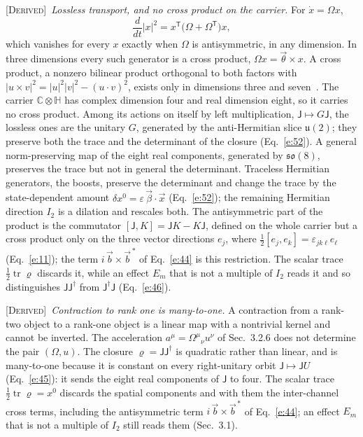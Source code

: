 \documentclass[10pt]{article}
\newcommand{\sJ}{\mathsf{J}}
\newcommand{\tr}{\operatorname{tr}}
\newcommand{\Derived}{\noindent\textsc{[Derived]}\ }
\begin{document}
\Derived \textit{Lossless transport, and no cross product on the carrier.} For $\dot x=\Omega x$,
\begin{equation*}
\frac{d}{dt}|x|^2=x^{\mathsf T}\bigl(\Omega+\Omega^{\mathsf T}\bigr)x ,
\end{equation*}
which vanishes for every $x$ exactly when $\Omega$ is antisymmetric, in any dimension. In three dimensions every such generator is a cross product, $\Omega x=\vec\theta\times x$. A cross product, a nonzero bilinear product orthogonal to both factors with $|u\times v|^2=|u|^2|v|^2-(u\cdot v)^2$, exists only in dimensions three and seven~\cite{browngray}. The carrier $\mathbb C\otimes\mathbb H$ has complex dimension four and real dimension eight, so it carries no cross product. Among its actions on itself by left multiplication, $\sJ\mapsto G\sJ$, the lossless ones are the unitary $G$, generated by the anti-Hermitian slice $\mathfrak u(2)$; they preserve both the trace and the determinant of the closure (Eq.~\eqref{e:52}). A general norm-preserving map of the eight real components, generated by $\mathfrak{so}(8)$, preserves the trace but not in general the determinant. Traceless Hermitian generators, the boosts, preserve the determinant and change the trace by the state-dependent amount $\delta x^0=\varepsilon\,\vec\beta\cdot\vec x$ (Eq.~\eqref{e:52}); the remaining Hermitian direction $I_2$ is a dilation and rescales both. The antisymmetric part of the product is the commutator $[\sJ,K]=\sJ K-K\sJ$, defined on the whole carrier but a cross product only on the three vector directions $e_j$, where $\tfrac12[e_j,e_k]=\varepsilon_{jk\ell}e_\ell$ (Eq.~\eqref{e:11}); the term $i\,\vec b\times\vec b^{\,*}$ of Eq.~\eqref{e:44} is this restriction. The scalar trace $\tfrac12\tr\varrho$ discards it, while an effect $E_m$ that is not a multiple of $I_2$ reads it and so distinguishes $\sJ\sJ^\dagger$ from $\sJ^\dagger\sJ$ (Eq.~\eqref{e:46}).

\Derived \textit{Contraction to rank one is many-to-one.} A contraction from a rank-two object to a rank-one object is a linear map with a nontrivial kernel and cannot be inverted. The acceleration $a^\mu=\Omega^\mu{}_\nu u^\nu$ of Sec.~3.2.6 does not determine the pair $(\Omega,u)$. The closure $\varrho=\sJ\sJ^\dagger$ is quadratic rather than linear, and is many-to-one because it is constant on every right-unitary orbit $\sJ\mapsto\sJ U$ (Eq.~\eqref{e:45}): it sends the eight real components of $\sJ$ to four. The scalar trace $\tfrac12\tr\varrho=x^0$ discards the spatial components and with them the inter-channel cross terms, including the antisymmetric term $i\,\vec b\times\vec b^{\,*}$ of Eq.~\eqref{e:44}; an effect $E_m$ that is not a multiple of $I_2$ still reads them (Sec.~3.1).
\end{document}

